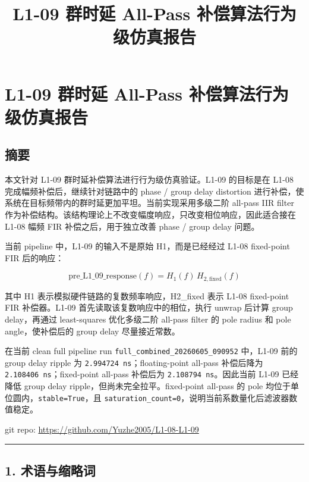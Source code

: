 \documentclass[
]{ctexart}
\title{L1-09 群时延 All-Pass 补偿算法行为级仿真报告}
\author{}
\date{}
\begin{document}
\section{L1-09 群时延 All-Pass
补偿算法行为级仿真报告}\label{l1-09-ux7fa4ux65f6ux5ef6-all-pass-ux8865ux507fux7b97ux6cd5ux884cux4e3aux7ea7ux4effux771fux62a5ux544a}

\subsection{摘要}\label{ux6458ux8981}

本文针对 L1-09 群时延补偿算法进行行为级仿真验证。L1-09 的目标是在 L1-08
完成幅频补偿后，继续针对链路中的 phase / group delay distortion
进行补偿，使系统在目标频带内的群时延更加平坦。当前实现采用多级二阶
all-pass IIR filter
作为补偿结构。该结构理论上不改变幅度响应，只改变相位响应，因此适合接在
L1-08 幅频 FIR 补偿之后，用于独立改善 phase / group delay 问题。

当前 pipeline 中，L1-09 的输入不是原始 H1，而是已经经过 L1-08
fixed-point FIR 后的响应：

\[
\mathrm{pre\_L1\_09\_response}(f)=H_1(f)\,H_{2,\mathrm{fixed}}(f)
\]

其中 H1 表示模拟硬件链路的复数频率响应，H2\_fixed 表示 L1-08 fixed-point
FIR 补偿器。L1-09 首先读取该复数响应中的相位，执行 unwrap 后计算 group
delay，再通过 least-squares 优化多级二阶 all-pass filter 的 pole radius
和 pole angle，使补偿后的 group delay 尽量接近常数。

在当前 clean full pipeline run \texttt{full\_combined\_20260605\_090952}
中，L1-09 前的 group delay ripple 为
\texttt{2.994724\ ns}；floating-point all-pass 补偿后降为
\texttt{2.108406\ ns}；fixed-point all-pass 补偿后为
\texttt{2.108794\ ns}。因此当前 L1-09 已经降低 group delay
ripple，但尚未完全拉平。fixed-point all-pass 的 pole
均位于单位圆内，\texttt{stable=True}，且
\texttt{saturation\_count=0}，说明当前系数量化后滤波器数值稳定。

git repo: \url{https://github.com/Yuzhe2005/L1-08-L1-09}

\begin{center}\rule{0.5\linewidth}{0.5pt}\end{center}

\subsection{1. 术语与缩略词}\label{ux672fux8bedux4e0eux7f29ux7565ux8bcd}
\end{document}
